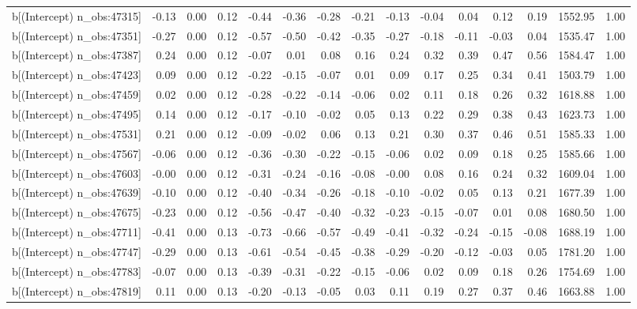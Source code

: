\begin{table}[ht]
\begin{tabular}{rrrrrrrrrrrrrrr}
  b[(Intercept) n\_obs:47315] & -0.13 & 0.00 & 0.12 & -0.44 & -0.36 & -0.28 & -0.21 & -0.13 & -0.04 & 0.04 & 0.12 & 0.19 & 1552.95 & 1.00 \\ 
  b[(Intercept) n\_obs:47351] & -0.27 & 0.00 & 0.12 & -0.57 & -0.50 & -0.42 & -0.35 & -0.27 & -0.18 & -0.11 & -0.03 & 0.04 & 1535.47 & 1.00 \\ 
  b[(Intercept) n\_obs:47387] & 0.24 & 0.00 & 0.12 & -0.07 & 0.01 & 0.08 & 0.16 & 0.24 & 0.32 & 0.39 & 0.47 & 0.56 & 1584.47 & 1.00 \\ 
  b[(Intercept) n\_obs:47423] & 0.09 & 0.00 & 0.12 & -0.22 & -0.15 & -0.07 & 0.01 & 0.09 & 0.17 & 0.25 & 0.34 & 0.41 & 1503.79 & 1.00 \\ 
  b[(Intercept) n\_obs:47459] & 0.02 & 0.00 & 0.12 & -0.28 & -0.22 & -0.14 & -0.06 & 0.02 & 0.11 & 0.18 & 0.26 & 0.32 & 1618.88 & 1.00 \\ 
  b[(Intercept) n\_obs:47495] & 0.14 & 0.00 & 0.12 & -0.17 & -0.10 & -0.02 & 0.05 & 0.13 & 0.22 & 0.29 & 0.38 & 0.43 & 1623.73 & 1.00 \\ 
  b[(Intercept) n\_obs:47531] & 0.21 & 0.00 & 0.12 & -0.09 & -0.02 & 0.06 & 0.13 & 0.21 & 0.30 & 0.37 & 0.46 & 0.51 & 1585.33 & 1.00 \\ 
  b[(Intercept) n\_obs:47567] & -0.06 & 0.00 & 0.12 & -0.36 & -0.30 & -0.22 & -0.15 & -0.06 & 0.02 & 0.09 & 0.18 & 0.25 & 1585.66 & 1.00 \\ 
  b[(Intercept) n\_obs:47603] & -0.00 & 0.00 & 0.12 & -0.31 & -0.24 & -0.16 & -0.08 & -0.00 & 0.08 & 0.16 & 0.24 & 0.32 & 1609.04 & 1.00 \\ 
  b[(Intercept) n\_obs:47639] & -0.10 & 0.00 & 0.12 & -0.40 & -0.34 & -0.26 & -0.18 & -0.10 & -0.02 & 0.05 & 0.13 & 0.21 & 1677.39 & 1.00 \\ 
  b[(Intercept) n\_obs:47675] & -0.23 & 0.00 & 0.12 & -0.56 & -0.47 & -0.40 & -0.32 & -0.23 & -0.15 & -0.07 & 0.01 & 0.08 & 1680.50 & 1.00 \\ 
  b[(Intercept) n\_obs:47711] & -0.41 & 0.00 & 0.13 & -0.73 & -0.66 & -0.57 & -0.49 & -0.41 & -0.32 & -0.24 & -0.15 & -0.08 & 1688.19 & 1.00 \\ 
  b[(Intercept) n\_obs:47747] & -0.29 & 0.00 & 0.13 & -0.61 & -0.54 & -0.45 & -0.38 & -0.29 & -0.20 & -0.12 & -0.03 & 0.05 & 1781.20 & 1.00 \\ 
  b[(Intercept) n\_obs:47783] & -0.07 & 0.00 & 0.13 & -0.39 & -0.31 & -0.22 & -0.15 & -0.06 & 0.02 & 0.09 & 0.18 & 0.26 & 1754.69 & 1.00 \\ 
  b[(Intercept) n\_obs:47819] & 0.11 & 0.00 & 0.13 & -0.20 & -0.13 & -0.05 & 0.03 & 0.11 & 0.19 & 0.27 & 0.37 & 0.46 & 1663.88 & 1.00 \\ 

\end{tabular}
\end{table}
